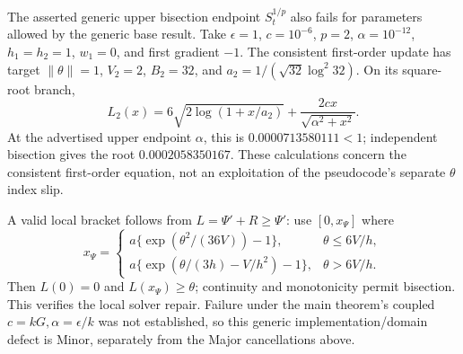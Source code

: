 \documentclass[10pt]{article}
\begin{document}
The asserted generic upper bisection endpoint \(S_t^{1/p}\) also fails for parameters allowed by the generic base result. Take \(\epsilon=1\), \(c=10^{-6}\), \(p=2\), \(\alpha=10^{-12}\), \(h_1=h_2=1\), \(w_1=0\), and first gradient \(-1\). The consistent first-order update has target \(\|\theta\|=1\), \(V_2=2\), \(B_2=32\), and \(a_2=1/(\sqrt{32}\log^2 32)\). On its square-root branch, \[L_2(x)=6\sqrt{2\log(1+x/a_2)}
       +\frac{2c x}{\sqrt{\alpha^2+x^2}}.\] At the advertised upper endpoint \(\alpha\), this is \(0.0000713580111<1\); independent bisection gives the root \(0.0002058350167\). These calculations concern the consistent first-order equation, not an exploitation of the pseudocode’s separate \(\theta\) index slip.\par
A valid local bracket follows from \(L=\Psi'+R\ge\Psi'\): use \([0,x_\Psi]\) where \[x_\Psi=
 \begin{cases}
 a\{\exp(\theta^2/(36V))-1\},&\theta\le6V/h,\\
 a\{\exp(\theta/(3h)-V/h^2)-1\},&\theta>6V/h .
 \end{cases}\] Then \(L(0)=0\) and \(L(x_\Psi)\ge\theta\); continuity and monotonicity permit bisection. This verifies the local solver repair. Failure under the main theorem’s coupled \(c=kG,\alpha=\epsilon/k\) was not established, so this generic implementation/domain defect is Minor, separately from the Major cancellations above.\par
\end{document}
